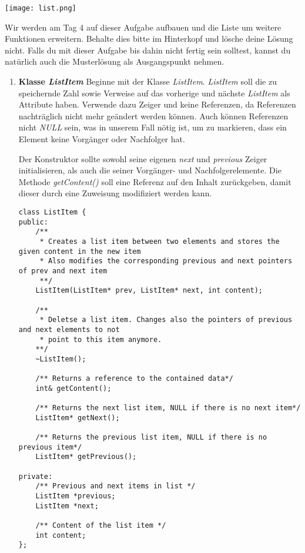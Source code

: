 \begin{center}
	\texttt{[image: list.png]}
\end{center}

Wir werden am Tag 4 auf dieser Aufgabe aufbauen und die Liste um weitere Funktionen erweitern.
Behalte dies bitte im Hinterkopf und lösche deine Lösung nicht.
Falls du mit dieser Aufgabe bis dahin nicht fertig sein solltest, kannst du natürlich auch die Musterlösung als Ausgangspunkt nehmen.

\begin{enumerate}
\item \textbf{Klasse \emph{ListItem}}
Beginne mit der Klasse \emph{ListItem}. 
\emph{ListItem} soll die zu speichernde Zahl sowie Verweise auf das vorherige und nächste \emph{ListItem} als Attribute haben.
Verwende dazu Zeiger und keine Referenzen, da Referenzen nachträglich nicht mehr geändert werden können.
Auch können Referenzen nicht \emph{NULL} sein, was in unserem Fall nötig ist, um zu markieren, dass ein Element keine Vorgänger oder Nachfolger hat.

Der Konstruktor sollte sowohl seine eigenen \emph{next} und \emph{previous} Zeiger initialisieren, als auch die seiner Vorgänger- und Nachfolgerelemente. 
Die Methode \emph{getContent()} soll eine Referenz auf den Inhalt zurückgeben, damit dieser durch eine Zuweisung modifiziert werden kann.

\begin{lstlisting}
class ListItem {
public:
	/** 
	 * Creates a list item between two elements and stores the given content in the new item
	 * Also modifies the corresponding previous and next pointers of prev and next item
	 **/
	ListItem(ListItem* prev, ListItem* next, int content);

	/** 
	 * Deletse a list item. Changes also the pointers of previous and next elements to not
	 * point to this item anymore.
	**/
	~ListItem();

	/** Returns a reference to the contained data*/
	int& getContent();

	/** Returns the next list item, NULL if there is no next item*/
	ListItem* getNext();

	/** Returns the previous list item, NULL if there is no previous item*/
	ListItem* getPrevious();

private:
	/** Previous and next items in list */
	ListItem *previous;
	ListItem *next;

	/** Content of the list item */
	int content;
};
\end{lstlisting}


\end{enumerate}
